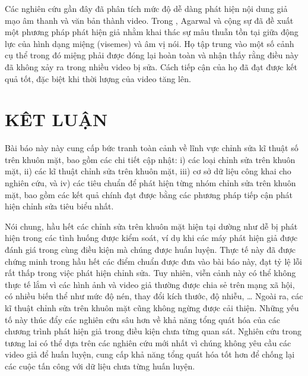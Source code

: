 \documentclass{article}
\begin{document}
Các nghiên cứu gần đây đã phân tích mức độ dễ dàng phát hiện nội dung giả mạo âm thanh và văn bản thành video. Trong , Agarwal và cộng sự đã đề xuất một phương pháp phát hiện giả nhằm khai thác sự mâu thuẫn tồn tại giữa động lực của hình dạng miệng (visemes) và âm vị nói. Họ tập trung vào một số cảnh cụ thể trong đó miệng phải được đóng lại hoàn toàn và nhận thấy rằng điều này đã không xảy ra trong nhiều video bị sửa. Cách tiếp cận của họ đã đạt được kết quả tốt, đặc biệt khi thời lượng của video tăng lên.

\section{KÊT LUẬN} \label{sec:8-conclusion}

Bài báo này này cung cấp bức tranh toàn cảnh về lĩnh vực chỉnh sửa kĩ thuật số trên khuôn mặt, bao gồm các chi tiết cập nhật: i) các loại chỉnh sửa trên khuôn mặt, ii) các kĩ thuật chỉnh sửa trên khuôn mặt, iii) cơ sở dữ liệu công khai cho nghiên cứu, và iv) các tiêu chuẩn để phát hiện từng nhóm chỉnh sửa trên khuôn mặt, bao gồm các kết quả chính đạt được bằng các phương pháp tiếp cận phát hiện chỉnh sửa tiêu biểu nhất.

Nói chung, hầu hết các chỉnh sửa trên khuôn mặt hiện tại dường như dễ bị phát hiện trong các tình huống được kiểm soát, ví dụ khi các máy phát hiện giả được đánh giá trong cùng điều kiện mà chúng được huấn luyện. Thực tế này đã được chứng minh trong hầu hết các điểm chuẩn được đưa vào bài báo này, đạt tỷ lệ lỗi rất thấp trong việc phát hiện chỉnh sửa. Tuy nhiên, viễn cảnh này có thể không thực tế lắm vì các hình ảnh và video giả thường được chia sẻ trên mạng xã hội, có nhiều biến thể như mức độ nén, thay đổi kích thước, độ nhiễu, … Ngoài ra, các kĩ thuật chỉnh sửa trên khuôn mặt cũng không ngừng được cải thiện. Những yếu tố này thúc đẩy các nghiên cứu sâu hơn về khả năng tổng quát hóa của các chương trình phát hiện giả trong điều kiện chưa từng quan sát. Nghiên cứu trong tương lai có thể dựa trên các nghiên cứu mới nhất vì chúng không yêu cầu các video giả để huấn luyện, cung cấp khả năng tổng quát hóa tốt hơn để chống lại các cuộc tấn công với dữ liệu chưa từng huấn luyện.
\end{document}
